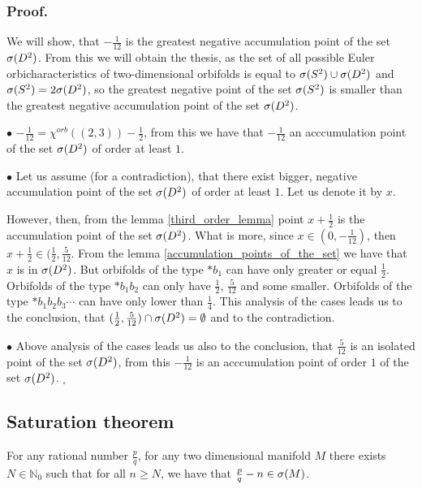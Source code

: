 \subsubsection{Proof.} 

We will show, that $-\frac{1}{12}$ is the greatest negative accumulation point of the set ${{\sigma}(D^2)}$. 
From this we will obtain the thesis, as the set of all possible Euler orbicharacteristics 
of two-dimensional orbifolds is equal to ${{\sigma}(S^2)} \cup {{\sigma}(D^2)}$ and ${{\sigma}(S^2)} = 2{{\sigma}(D^2)}$, so 
the greatest negative point of the set ${{\sigma}(S^2)}$ is smaller than the greatest negative accumulation 
point of the set ${{\sigma}(D^2)}$. 

$\bullet$ $-\frac{1}{12}=\chi^{orb}((2,3))-\frac{1}{2}$, from this we have that $-\frac{1}{12}$ 
an acccumulation point of the set ${{\sigma}(D^2)}$ of order at least $1$. 

$\bullet$ Let us assume (for a contradiction), that there exist bigger, negative 
accumulation point of the set ${{\sigma}(D^2)}$ of order at least $1$. Let us denote it by $x$. 

However, then, from the lemma \ref{third_order_lemma} point $x+\frac{1}{2}$ is the accumulation 
point of the set ${{\sigma}(D^2)}$. What is more, since $x\in (0, -\frac{1}{12})$, then $x+\frac{1}{2} 
\in (\frac{1}{2}, \frac{5}{12}$. From the lemma \ref{accumulation_points_of_the_set} we 
have that $x$ is in ${{\sigma}(D^2)}$. But orbifolds of the type $\ast b_1$ can have \Eoc only greater or 
equal $\frac{1}{2}$. Orbifolds of the type $\ast b_1b_2$ can only have \Eoc $\frac{1}{2}$, 
$\frac{5}{12}$ and some smaller. Orbifolds of the type $\ast b_1b_2b_3\cdots$ can have \Eoc only 
lower than $\frac{1}{4}$. This analysis of the cases leads us to the conclusion, that 
$(\frac{1}{2},\frac{5}{12})\cap {{\sigma}(D^2)}=\emptyset$ and to the contradiction. 

$\bullet$ Above analysis of the cases leads us also to the conclusion, that $\frac{5}{12}$ 
is 
an isolated point of the set ${{\sigma}(D^2)}$, from this $-\frac{1}{12}$ is an acccumulation point 
of order $1$ of the set ${{\sigma}(D^2)}$. $_\square$ 

\subsection{Saturation theorem}
\begin{theorem}\label{saturation theorem}
For any rational number $\frac{p}{q}$, for any two dimensional manifold $M$
there exists $N\in\mathbb{N}_0$ such that 
for all $n \geq N$, we have that $\frac{p}{q} - n \in {{\sigma}(M)}$.
\end{theorem}
